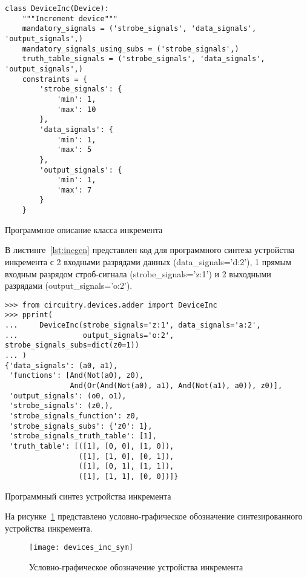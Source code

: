 \documentclass[document.tex]{subfiles}
\begin{document}
\begin{listing}[ht]
\begin{verbatim}
class DeviceInc(Device):
    """Increment device"""
    mandatory_signals = ('strobe_signals', 'data_signals', 'output_signals',)
    mandatory_signals_using_subs = ('strobe_signals',)
    truth_table_signals = ('strobe_signals', 'data_signals', 'output_signals',)
    constraints = {
        'strobe_signals': {
            'min': 1,
            'max': 10
        },
        'data_signals': {
            'min': 1,
            'max': 5
        },
        'output_signals': {
            'min': 1,
            'max': 7
        }
    }
\end{verbatim}
\caption{Программное описание класса инкремента}
\label{lst:inc}
\end{listing}

\clearpage
В листинге~\ref{lst:incgen} представлен код для программного синтеза
устройства инкремента с 2 входными разрядами данных (data\_signals='d:2'), 1
прямым входным разрядом строб-сигнала (strobe\_signals='z:1') и 2 выходными
разрядами (output\_signals='o:2').

\begin{listing}[ht]
\begin{verbatim}
>>> from circuitry.devices.adder import DeviceInc             
>>> pprint(                                                 
...     DeviceInc(strobe_signals='z:1', data_signals='a:2',
...               output_signals='o:2', strobe_signals_subs=dict(z0=1))
... )
{'data_signals': (a0, a1),
 'functions': [And(Not(a0), z0),
               And(Or(And(Not(a0), a1), And(Not(a1), a0)), z0)],
 'output_signals': (o0, o1),
 'strobe_signals': (z0,),
 'strobe_signals_function': z0,
 'strobe_signals_subs': {'z0': 1},
 'strobe_signals_truth_table': [1],
 'truth_table': [([1], [0, 0], [1, 0]),
                 ([1], [1, 0], [0, 1]),
                 ([1], [0, 1], [1, 1]),
                 ([1], [1, 1], [0, 0])]}
\end{verbatim}
\caption{Программный синтез устройства инкремента}
\label{lst:incgen}
\end{listing}

На рисунке~\ref{fig:deviceinc} представлено условно-графическое обозначение
синтезированного устройства инкремента.

\begin{figure}[here]
\centering
\texttt{[image: devices\_inc\_sym]}
\caption{Условно-графическое обозначение устройства инкремента}
\label{fig:deviceinc}
\end{figure}
\end{document}
